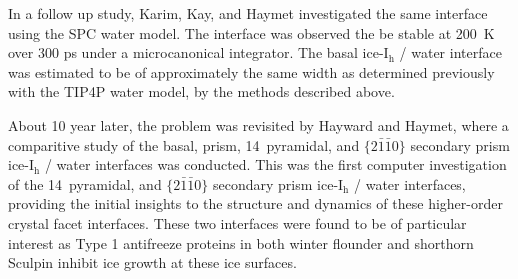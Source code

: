 In a follow up study, Karim, Kay, and Haymet investigated the same
interface using the SPC water model.\cite{Karim1990} The interface was
observed the be stable at 200~K over 300 ps under a microcanonical
integrator. The basal ice-I$_\mathrm{h}$ / water interface was
estimated to be of approximately the same width as determined
previously with the TIP4P water model, by the methods described
above. 

About 10 year later, the problem was revisited by Hayward and Haymet,
where a comparitive study of the basal, prism, 14\degree~pyramidal,
and $\{2\bar{1}\bar{1}0\}$ secondary prism ice-I$_\mathrm{h}$ / water
interfaces was conducted.\cite{Hayward2001} This was the
first computer investigation of the 14\degree~pyramidal, and
$\{2\bar{1}\bar{1}0\}$ secondary prism ice-I$_\mathrm{h}$ / water
interfaces, providing the initial insights to the structure and
dynamics of these higher-order crystal facet interfaces. These two
interfaces were found to be of particular interest as Type 1
antifreeze proteins in both winter flounder and shorthorn Sculpin
inhibit ice growth at these ice
surfaces.\cite{Knight2001,Wierzbicki1996,Haymet1998,Harding1999}

